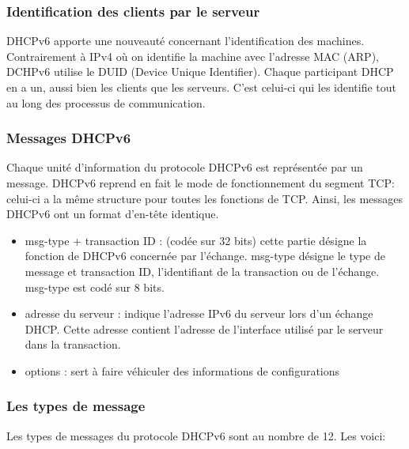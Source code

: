 \subsubsection{Identification des clients par le serveur}

DHCPv6 apporte une nouveauté concernant l’identification des machines. 
Contrairement à IPv4 où on identifie la machine avec l’adresse MAC (ARP), DCHPv6 utilise le DUID (Device Unique Identifier).
Chaque participant DHCP en a un, aussi bien les clients que les serveurs. 
C’est celui-ci qui les identifie tout au long des processus de communication.

\subsubsection{Messages DHCPv6}

Chaque unité d’information du protocole DHCPv6 est représentée par un message. 
DHCPv6 reprend en fait le mode de fonctionnement du segment TCP: celui-ci a la même structure pour toutes les fonctions de TCP. Ainsi, les messages DHCPv6 ont un format d’en-tête identique. 


\begin{itemize}
	\item msg-type + transaction ID : (codée sur 32 bits) cette partie désigne la fonction de DHCPv6 concernée par l’échange. msg-type désigne le type de message et transaction ID, l’identifiant de la transaction ou de l’échange. msg-type est codé sur 8 bits. 

	\item adresse du serveur : indique l’adresse IPv6 du serveur lors d’un échange DHCP. Cette adresse contient l’adresse de l’interface utilisé par le serveur dans la transaction.

	\item options : sert à faire véhiculer des informations de configurations
\end{itemize}


\subsubsection{Les types de message}

Les types de messages du protocole DHCPv6 sont au nombre de 12. Les voici: 

